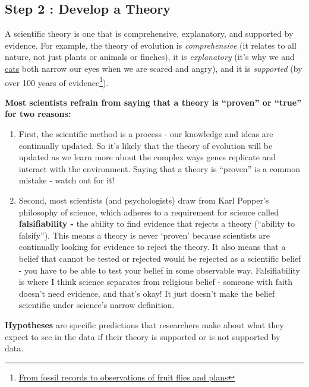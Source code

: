 \documentclass[
  letterpaper,
  DIV=11,
  numbers=noendperiod,
  oneside]{scrreprt}
\begin{document}
\subsection{Step 2 : Develop a Theory}\label{step-2-develop-a-theory}

A scientific theory is one that is comprehensive, explanatory, and
supported by evidence. For example, the theory of evolution is
\emph{comprehensive} (it relates to all nature, not just plants or
animals or finches), it is \emph{explanatory} (it's why we and
\href{https://www.gutenberg.org/files/1227/1227-h/images/fig15.jpg}{cats}
both narrow our eyes when we are scared and angry), and it is
\emph{supported} (by over 100 years of evidence\footnote{\href{https://evolution.berkeley.edu/evolibrary/article/0_0_0/lines_01}{From
  fossil records to observations of fruit flies and plans}}).~

\textbf{Most scientists refrain from saying that a theory is ``proven''
or ``true'' for two reasons:}

\begin{enumerate}
\def\labelenumi{\arabic{enumi}.}
\item
  First, the scientific method is a process - our knowledge and ideas
  are continually updated. So it's likely that the theory of evolution
  will be updated as we learn more about the complex ways genes
  replicate and interact with the environment. Saying that a theory is
  ``proven'' is a common mistake - watch out for it!~
\item
  Second, most scientists (and psychologists) draw from Karl Popper's
  philosophy of science, which adheres to a requirement for science
  called \textbf{falsifiability -} the ability to find evidence that
  rejects a theory (``ability to falsify''). This means a theory is
  never `proven' because scientists are continually looking for evidence
  to reject the theory. It also means that a belief that cannot be
  tested or rejected would be rejected as a scientific belief - you have
  to be able to test your belief in some observable way. Falsifiability
  is where I think science separates from religious belief - someone
  with faith doesn't need evidence, and that's okay! It just doesn't
  make the belief scientific under science's narrow definition.~
\end{enumerate}

\textbf{Hypotheses} are specific predictions that researchers make about
what they expect to see in the data if their theory is supported or is
not supported by data.~
\end{document}

